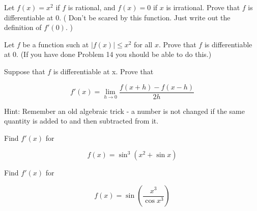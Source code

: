 \documentclass[12pt,letterpaper]{hmcpset}
\begin{document}

\begin{problem}[9.14]

Let $f(x) = x^2$ if $f$ is rational, and $f(x) = 0$ if $x$ is irrational. Prove that $f$ is differentiable at $0$. ( Don't be scared by this function. Just write out the definition of $f'(0).$ )
     
\end{problem}

\begin{solution}

\end{solution}
\newpage

\begin{problem}[9.15.a]

Let $f$ be a function such at $\left\lvert f(x) \right\lvert \leq x^2$ for all $x$. Prove that $f$ is differentiable at 0. (If you have done Problem 14 you should be able to do this.)
  
\end{problem}

\begin{solution}

\end{solution}
\newpage

\begin{problem}[9.22.a]
Suppose that $f$ is differentiable at x. Prove that 

\begin{equation*}
f'(x) = \lim_{h\to{}0} \dfrac{f(x+h)-f(x-h)}{2h}
\end{equation*}

Hint: Remember an old algebraic trick - a number is not changed if the same quantity is added to and then subtracted from it.
   
\end{problem}

\begin{solution}


\end{solution}
\newpage

\begin{problem}[10.2.ii]
Find $f'(x)$ for 

\[ f(x) = \sin^3(x^2+\sin{x}) \]
   
\end{problem}

\begin{solution}
\end{solution}
\newpage

\begin{problem}[10.2.ii]
Find $f'(x)$ for 

\[ f(x) = \sin\left( \dfrac{x^3}{\cos{x^3}} \right) \]
   
\end{problem}

\begin{solution}
\end{solution}
\newpage
\end{document}

